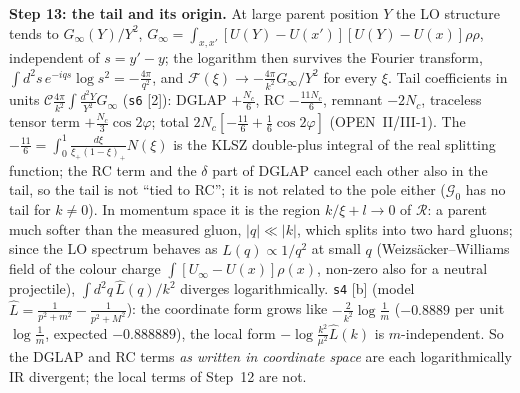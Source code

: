 \noindent\textbf{Step 13: the tail and its origin.} At large parent position $Y$ the LO structure tends to $G_{\infty}(Y)/Y^{2}$, $G_{\infty}=\int_{x,x'}[U(Y)-U(x')][U(Y)-U(x)]\rho\rho$, independent of $s=y'-y$; the logarithm then survives the Fourier transform, $\int d^{2}s\,e^{-iqs}\log s^{2}=-\frac{4\pi}{q^{2}}$, and $\mathcal{F}(\xi)\to-\frac{4\pi}{k^{2}}G_{\infty}/Y^{2}$ for every $\xi$. Tail coefficients in units $\mathcal{C}\frac{4\pi}{k^{2}}\int\frac{d^{2}Y}{Y^{2}}G_{\infty}$ (\texttt{s6} [2]): DGLAP $+\frac{N_{c}}{6}$, RC $-\frac{11N_{c}}{6}$, remnant $-2N_{c}$, traceless tensor term $+\frac{N_{c}}{3}\cos2\varphi$; total $2N_{c}[-\frac{11}{6}+\frac16\cos2\varphi]$ (OPEN~II/III-1). The $-\frac{11}{6}=\int_{0}^{1}\frac{d\xi}{\xi_{+}(1-\xi)_{+}}N(\xi)$ is the KLSZ double-plus integral of the real splitting function; the RC term and the $\delta$ part of DGLAP cancel each other also in the tail, so the tail is not ``tied to RC''; it is not related to the pole either ($\mathcal{G}_{0}$ has no tail for $k\neq0$). In momentum space it is the region $k/\xi+l\to0$ of $\mathcal{R}$: a parent much softer than the measured gluon, $|q|\ll|k|$, which splits into two hard gluons; since the LO spectrum behaves as $\widehat{L}(q)\propto1/q^{2}$ at small $q$ (Weizs\"acker--Williams field of the colour charge $\int[U_{\infty}-U(x)]\rho(x)$, non-zero also for a neutral projectile), $\int d^{2}q\,\widehat{L}(q)/k^{2}$ diverges logarithmically. \texttt{s4} [b] (model $\widehat{L}=\frac{1}{p^{2}+m^{2}}-\frac{1}{p^{2}+M^{2}}$): the coordinate form grows like $-\frac{2}{k^{2}}\log\frac1m$ ($-0.8889$ per unit $\log\frac1m$, expected $-0.888889$), the local form $-\log\frac{k^{2}}{\mu^{2}}\widehat{L}(k)$ is $m$-independent. So the DGLAP and RC terms \emph{as written in coordinate space} are each logarithmically IR divergent; the local terms of Step~12 are not.


